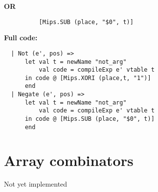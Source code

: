 \documentclass[12pt]{article}
\begin{document}
\textbf{OR}
\begin{verbatim}
          [Mips.SUB (place, "$0", t)]
\end{verbatim}
\clearpage
\textbf{Full code:}
\begin{verbatim}
  | Not (e', pos) =>
      let val t = newName "not_arg"
          val code = compileExp e' vtable t
      in code @ [Mips.XORI (place,t, "1")]
      end
  | Negate (e', pos) =>
      let val t = newName "not_arg"
          val code = compileExp e' vtable t
      in code @ [Mips.SUB (place, "$0", t)]
      end
\end{verbatim}
\section{Array combinators}
Not yet implemented
\end{document}
